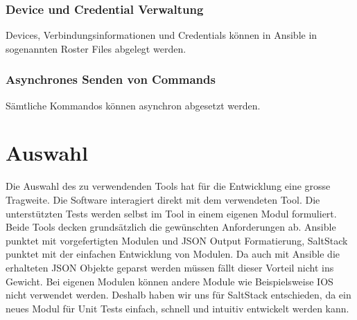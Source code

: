\documentclass[a4,12pt]{scrartcl}
\begin{document}
\subsubsection{Device und Credential Verwaltung}
Devices, Verbindungsinformationen und Credentials können in Ansible in sogenannten Roster Files abgelegt werden. 
\subsubsection{Asynchrones Senden von Commands}
Sämtliche Kommandos können asynchron abgesetzt werden.
\newpage
\section{Auswahl}
Die Auswahl des zu verwendenden Tools hat für die Entwicklung eine grosse Tragweite. Die Software interagiert direkt mit dem verwendeten Tool. Die unterstützten Tests werden selbst im Tool in einem eigenen Modul formuliert. \\

\noindent Beide Tools decken grundsätzlich die gewünschten Anforderungen ab. Ansible punktet mit vorgefertigten Modulen und JSON Output Formatierung, SaltStack punktet mit der einfachen Entwicklung von Modulen. Da auch mit Ansible die erhalteten JSON Objekte geparst werden müssen fällt dieser Vorteil nicht ins Gewicht. Bei eigenen Modulen können andere Module wie Beispielsweise IOS nicht verwendet werden. Deshalb haben wir uns für SaltStack entschieden, da ein neues Modul für Unit Tests einfach, schnell und intuitiv entwickelt werden kann.
\end{document}
